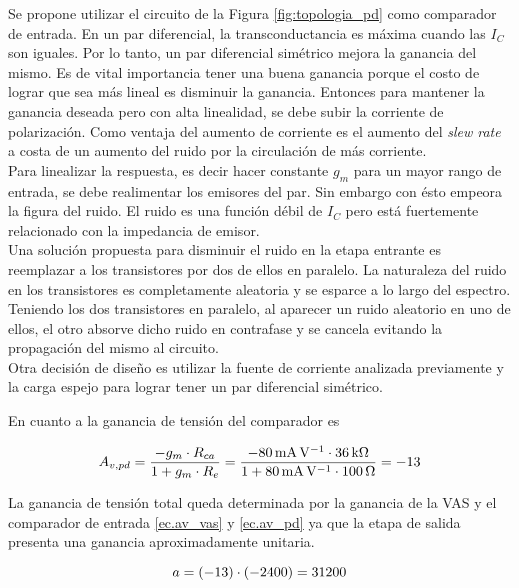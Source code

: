 
	Se propone utilizar el circuito de la Figura \ref{fig:topologia_pd} como comparador de entrada. En un par diferencial, la transconductancia es máxima cuando las $I_C$ son iguales. Por lo tanto, un par diferencial simétrico mejora la ganancia del mismo. Es de vital importancia tener una buena ganancia porque el costo de lograr que sea más lineal es disminuir la ganancia. Entonces para mantener la ganancia deseada pero con alta linealidad, se debe subir la corriente de polarización. Como ventaja del aumento de corriente es el aumento del \emph{slew rate} a costa de un aumento del ruido por la circulación de más corriente.\\
	\indent Para linealizar la respuesta, es decir hacer constante $g_m$ para un mayor rango de entrada, se debe realimentar los emisores del par. 	Sin embargo con ésto empeora la figura del ruido. El ruido es una función débil de $I_C$ pero está fuertemente relacionado con la impedancia de emisor.\\

	Una solución propuesta para disminuir el ruido en la etapa entrante es reemplazar a los transistores por dos de ellos en paralelo. La naturaleza del ruido en los transistores es completamente aleatoria y se esparce a lo largo del espectro. Teniendo los dos transistores en paralelo, al aparecer un ruido aleatorio en uno de ellos, el otro absorve dicho ruido en contrafase y se cancela evitando la propagación del mismo al circuito. \\
%
	\indent Otra decisión de diseño es utilizar la fuente de corriente analizada previamente y la carga espejo para lograr tener un par diferencial simétrico. 

	En cuanto a la ganancia de tensión del comparador es

\begin{equation}
	\centering
	A_{v,pd} = \frac{-g_m \cdot R_{ca}}{1+g_m \cdot R_e} = \frac{\SI{-80}{\mA\per\V} \cdot \SI{36}{\kilo\ohm} }{ 1 + \SI{80}{\mA\per\V} \cdot \SI{100}{\ohm} } = -13
	\label{ec.av_pd}
\end{equation}



La ganancia de tensión total queda determinada por la ganancia de la VAS y el comparador de entrada \eqref{ec.av_vas} y \eqref{ec.av_pd} ya que la etapa de salida presenta una ganancia aproximadamente unitaria.

\begin{equation}
	\centering
	a = (-13) \cdot (-2400) = 31200
	\label{ec.a}
\end{equation}
